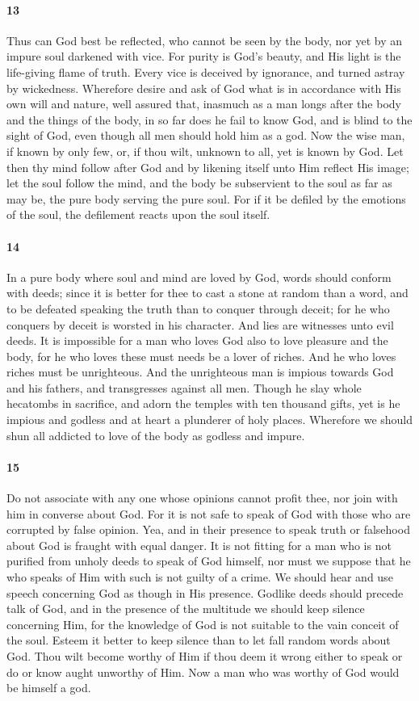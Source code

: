 \documentclass[12pt]{article}
\begin{document}
\paragraph{13} Thus can God best be reflected, who cannot be seen by the body,
nor yet by an impure soul darkened with vice. For purity is God's beauty, and
His light is the life-giving flame of truth. Every vice is deceived by
ignorance, and turned astray by wickedness. Wherefore desire and ask of God
what is in accordance with His own will and nature, well assured that, inasmuch
as a man longs after the body and the things of the body, in so far does he
fail to know God, and is blind to the sight of God, even though all men should
hold him as a god. Now the wise man, if known by only few, or, if thou wilt,
unknown to all, yet is known by God. Let then thy mind follow after God and by
likening itself unto Him reflect His image; let the soul follow the mind, and
the body be subservient to the soul as far as may be, the pure body serving the
pure soul. For if it be defiled by the emotions of the soul, the defilement
reacts upon the soul itself.

\paragraph{14} In a pure body where soul and mind are loved by God, words
should conform with deeds; since it is better for thee to cast a stone at
random than a word, and to be defeated speaking the truth than to conquer
through deceit; for he who conquers by deceit is worsted in his character. And
lies are witnesses unto evil deeds. It is impossible for a man who loves God
also to love pleasure and the body, for he who loves these must needs be a
lover of riches. And he who loves riches must be unrighteous. And the
unrighteous man is impious towards God and his fathers, and transgresses
against all men. Though he slay whole hecatombs in sacrifice, and adorn the
temples with ten thousand gifts, yet is he impious and godless and at heart a
plunderer of holy places. Wherefore we should shun all addicted to love of the
body as godless and impure.

\paragraph{15} Do not associate with any one whose opinions cannot profit thee,
nor join with him in converse about God. For it is not safe to speak of God
with those who are corrupted by false opinion. Yea, and in their presence to
speak truth or falsehood about God is fraught with equal danger. It is not
fitting for a man who is not purified from unholy deeds to speak of God
himself, nor must we suppose that he who speaks of Him with such is not guilty
of a crime. We should hear and use speech concerning God as though in His
presence. Godlike deeds should precede talk of God, and in the presence of the
multitude we should keep silence concerning Him, for the knowledge of God is
not suitable to the vain conceit of the soul. Esteem it better to keep silence
than to let fall random words about God. Thou wilt become worthy of Him if thou
deem it wrong either to speak or do or know aught unworthy of Him. Now a man
who was worthy of God would be himself a god.
\end{document}
